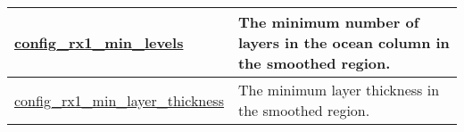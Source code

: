 {\begin{center}
\begin{longtable}{| p{2.0in} || p{4.0in} |}
    \hline
    \hyperref[subsec:nm_sec_config_rx1_min_levels]{config\_rx1\_min\_levels} & The minimum number of layers in the ocean column in the smoothed region. \\
    \hline
    \hyperref[subsec:nm_sec_config_rx1_min_layer_thickness]{config\_rx1\_min\_layer\_thickness} & The minimum layer thickness in the smoothed region. \\
    \hline
\end{longtable}
\end{center}
}
